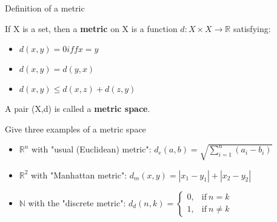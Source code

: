 \documentclass[12pt]{article}
\newcommand{\R}{\mathbb{R}}
\newcommand{\N}{\mathbb{N}}
\begin{document}
\begin{centering}
  Definition of a metric\\
\end{centering}
If X is a set, then a \textbf{metric} on X is a function $d:X\times X \rightarrow \R$ satisfying:
\begin{itemize}
  \item $d(x,y) = 0 iff x=y$
  \item $d(x,y) = d(y,x)$
  \item $d(x,y) \leq d(x,z) + d(z,y)$
\end{itemize}
A pair (X,d) is called a \textbf{metric space}.\par\medskip

Give three examples of a metric space
\begin{itemize}
  \item $\R^n$ with "usual (Euclidean) metric": $d_e(a,b) = \sqrt{\sum_{i=1}^n (a_i - b_i)}$
  \item $\R^2$ with "Manhattan metric": $d_m(x,y) = |x_1 - y_1| + |x_2 - y_2|$
  \item $\N$ with the "discrete metric": $d_d(n,k) = \begin{cases}
      0, & \text{if}\ n=k \\
      1, & \text{if}\ n \neq k
    \end{cases}$
\end{itemize}
\end{document}
